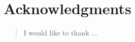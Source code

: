 \chapter*{Acknowledgments}
\thispagestyle{empty}


\begin{quote}
I would like to thank ...
\end{quote}


